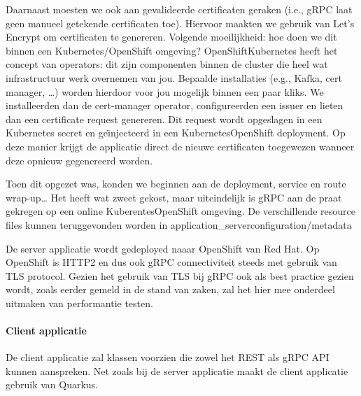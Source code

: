 Daarnaast moesten we ook aan gevalideerde certificaten geraken (i.e., gRPC laat geen manueel getekende certificaten toe). Hiervoor maakten we
gebruik van Let's Encrypt om certificaten te genereren. Volgende moeilijkheid: hoe doen we dit binnen een Kubernetes/OpenShift omgeving?
OpenShift\/Kubernetes heeft het concept van operators: dit zijn componenten binnen de cluster die heel wat infrastructuur werk overnemen van jou.
Bepaalde installaties (e.g., Kafka, cert manager, \ldots) worden hierdoor voor jou mogelijk binnen een paar kliks. We installeerden dan de
cert-manager operator, configureerden een issuer en lieten dan een certificate request genereren. Dit request wordt opgeslagen in een Kubernetes
secret en ge\"{\i}njecteerd in een Kubernetes\/OpenShift deployment. Op deze manier krijgt de applicatie direct de nieuwe certificaten toegewezen
wanneer deze opnieuw gegenereerd worden.

Toen dit opgezet was, konden we beginnen aan de deployment, service en route wrap-up\ldots
Het heeft wat zweet gekost, maar uiteindelijk is gRPC aan de praat gekregen op een online Kuberentes\/OpenShift omgeving.
De verschillende resource files kunnen teruggevonden worden in application\_server\/configuration/metadata

De server applicatie wordt gedeployed naaar OpenShift van Red Hat. Op OpenShift is HTTP2 en dus ook gRPC connectiviteit steeds met gebruik van TLS protocol.
Gezien het gebruik van TLS bij gRPC ook als best practice gezien wordt, zoals eerder gemeld in de stand van zaken, zal het hier mee onderdeel uitmaken van performantie testen.\newline
~\autocite{openshifttls}

\paragraph{Client applicatie}

De client applicatie zal klassen voorzien die zowel het REST als gRPC API kunnen aanspreken.
Net zoals bij de server applicatie maakt de client applicatie gebruik van Quarkus.\\

